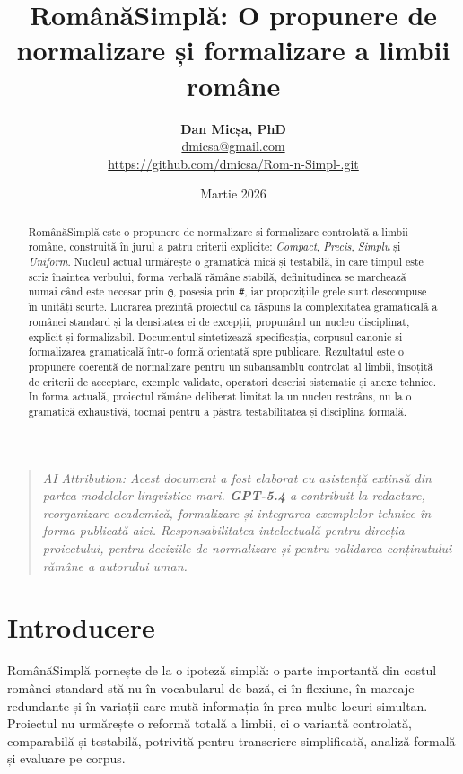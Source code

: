 \documentclass[12pt,onecolumn,letterpaper]{article}
\title{\Large\textbf{RomânăSimplă: O propunere de normalizare și formalizare a limbii române}}
\author{\textbf{Dan Micșa, PhD}\\
\small \href{mailto:dmicsa@gmail.com}{dmicsa@gmail.com}\\
\small \url{https://github.com/dmicsa/Rom-n-Simpl-.git}}
\date{Martie 2026}
\newcommand{\rs}[1]{\texttt{#1}}
\begin{document}
\maketitle
\thispagestyle{empty}

\begin{quote}
\small\textit{AI Attribution: Acest document a fost elaborat cu asistență extinsă din partea modelelor lingvistice mari. \textbf{GPT-5.4} a contribuit la redactare, reorganizare academică, formalizare și integrarea exemplelor tehnice în forma publicată aici. Responsabilitatea intelectuală pentru direcția proiectului, pentru deciziile de normalizare și pentru validarea conținutului rămâne a autorului uman.}
\end{quote}

\clearpage

\begin{abstract}
RomânăSimplă este o propunere de normalizare și formalizare controlată a limbii române,
construită în jurul a patru criterii explicite: \textit{Compact},
\textit{Precis}, \textit{Simplu} și \textit{Uniform}. Nucleul actual urmărește
o gramatică mică și testabilă, în care timpul este scris înaintea verbului,
forma verbală rămâne stabilă, definitudinea se marchează numai când este
necesar prin \rs{@}, posesia prin \rs{\#}, iar propozițiile grele sunt
descompuse în unități scurte. Lucrarea prezintă proiectul ca răspuns la
complexitatea gramaticală a românei standard și la densitatea ei de excepții,
propunând un nucleu disciplinat, explicit și formalizabil. Documentul sintetizează
specificația, corpusul canonic și formalizarea gramaticală într-o formă orientată
spre publicare. Rezultatul este o propunere coerentă de normalizare pentru un
subansamblu controlat al limbii, însoțită de criterii de acceptare, exemple
validate, operatori descriși sistematic și anexe tehnice. În forma actuală,
proiectul rămâne deliberat limitat la un nucleu restrâns, nu la o gramatică
exhaustivă, tocmai pentru a păstra testabilitatea și disciplina formală.
\end{abstract}

\tableofcontents
\vspace{1em}

\section{Introducere}

RomânăSimplă pornește de la o ipoteză simplă: o parte importantă din costul
românei standard stă nu în vocabularul de bază, ci în flexiune, în marcaje
redundante și în variații care mută informația în prea multe locuri simultan.
Proiectul nu urmărește o reformă totală a limbii, ci o variantă controlată,
comparabilă și testabilă, potrivită pentru transcriere simplificată, analiză
formală și evaluare pe corpus.
\end{document}
